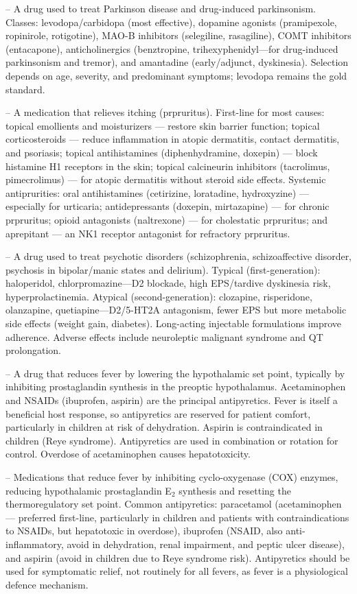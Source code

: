 -- A drug used to treat Parkinson disease and drug-induced parkinsonism. Classes: levodopa/carbidopa (most effective), dopamine agonists (pramipexole, ropinirole, rotigotine), MAO-B inhibitors (selegiline, rasagiline), COMT inhibitors (entacapone), anticholinergics (benztropine, trihexyphenidyl—for drug-induced parkinsonism and tremor), and amantadine (early/adjunct, dyskinesia). Selection depends on age, severity, and predominant symptoms; levodopa remains the gold standard.

-- A medication that relieves itching (prpruritus). First-line for most causes: topical emollients and moisturizers — restore skin barrier function; topical corticosteroids — reduce inflammation in atopic dermatitis, contact dermatitis, and psoriasis; topical antihistamines (diphenhydramine, doxepin) — block histamine H1 receptors in the skin; topical calcineurin inhibitors (tacrolimus, pimecrolimus) — for atopic dermatitis without steroid side effects. Systemic antiprurities: oral antihistamines (cetirizine, loratadine, hydroxyzine) — especially for urticaria; antidepressants (doxepin, mirtazapine) — for chronic prpruritus; opioid antagonists (naltrexone) — for cholestatic prpruritus; and aprepitant — an NK1 receptor antagonist for refractory prpruritus.

-- A drug used to treat psychotic disorders (schizophrenia, schizoaffective disorder, psychosis in bipolar/manic states and delirium). Typical (first-generation): haloperidol, chlorpromazine—D2 blockade, high EPS/tardive dyskinesia risk, hyperprolactinemia. Atypical (second-generation): clozapine, risperidone, olanzapine, quetiapine—D2/5-HT2A antagonism, fewer EPS but more metabolic side effects (weight gain, diabetes). Long-acting injectable formulations improve adherence. Adverse effects include neuroleptic malignant syndrome and QT prolongation.

-- A drug that reduces fever by lowering the hypothalamic set point, typically by inhibiting prostaglandin synthesis in the preoptic hypothalamus. Acetaminophen and NSAIDs (ibuprofen, aspirin) are the principal antipyretics. Fever is itself a beneficial host response, so antipyretics are reserved for patient comfort, particularly in children at risk of dehydration. Aspirin is contraindicated in children (Reye syndrome). Antipyretics are used in combination or rotation for control. Overdose of acetaminophen causes hepatotoxicity.

-- Medications that reduce fever by inhibiting cyclo-oxygenase (COX) enzymes, reducing hypothalamic prostaglandin E$_2$ synthesis and resetting the thermoregulatory set point. Common antipyretics: paracetamol (acetaminophen — preferred first-line, particularly in children and patients with contraindications to NSAIDs, but hepatotoxic in overdose), ibuprofen (NSAID, also anti-inflammatory, avoid in dehydration, renal impairment, and peptic ulcer disease), and aspirin (avoid in children due to Reye syndrome risk). Antipyretics should be used for symptomatic relief, not routinely for all fevers, as fever is a physiological defence mechanism.

